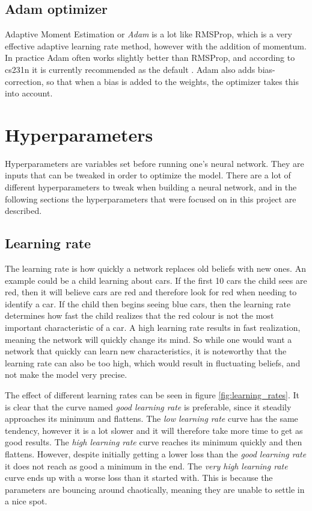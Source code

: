 \subsection{Adam optimizer}
Adaptive Moment Estimation or \emph{Adam} is a lot like RMSProp, which is a very effective adaptive learning rate method, however with the addition of momentum. In practice Adam often works slightly better than RMSProp, and according to cs231n it is currently recommended as the default \citep{NN3}. Adam also adds bias-correction, so that when a bias is added to the weights, the optimizer takes this into account. 


\section{Hyperparameters}
Hyperparameters are variables set before running one's neural network. They are inputs that can be tweaked in order to optimize the model. There are a lot of different hyperparameters to tweak when building a neural network, and in the following sections the hyperparameters that were focused on in this project are described. 


\subsection{Learning rate}
The learning rate is how quickly a network replaces old beliefs with new ones. An example could be a child learning about cars. If the first 10 cars the child sees are red, then it will believe cars are red and therefore look for red when needing to identify a car. If the child then begins seeing blue cars, then the learning rate determines how fast the child realizes that the red colour is not the most important characteristic of a car. A high learning rate results in fast realization, meaning the network will quickly change its mind. So while one would want a network that quickly can learn new characteristics, it is noteworthy that the learning rate can also be too high, which would result in fluctuating beliefs, and not make the model very precise. 


The effect of different learning rates can be seen in figure \ref{fig:learning_rates}. It is clear that the curve named \emph{good learning rate} is preferable, since it steadily approaches its minimum and flattens. The \emph{low learning rate} curve has the same tendency, however it is a lot slower and it will therefore take more time to get as good results. The \emph{high learning rate} curve reaches its minimum quickly and then flattens. However, despite initially getting a lower loss than the \emph{good learning rate} it does not reach as good a minimum in the end. The \emph{very high learning rate} curve ends up with a worse loss than it started with. This is because the parameters are bouncing around chaotically, meaning they are unable to settle in a nice spot. 

